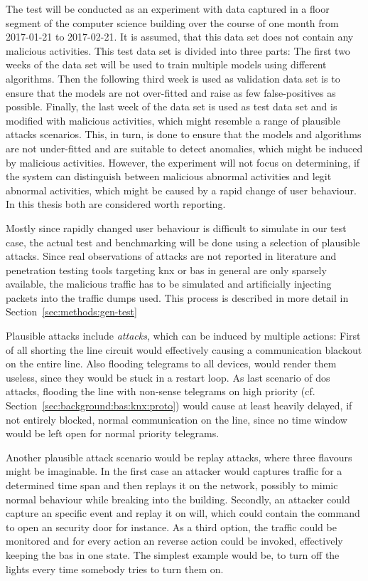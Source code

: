 The test will be conducted as an experiment with data captured in a floor segment of the computer science building over the course of one month from 2017-01-21 to 2017-02-21. It is assumed, that this data set does not contain any malicious activities.
This test data set is divided into three parts:
The first two weeks of the data set will be used to train multiple models using different algorithms.
Then the following third week is used as validation data set is to ensure that the models are not over-fitted and raise as few false-positives as possible.
Finally, the last week of the data set is used as test data set and is modified with malicious activities, which might resemble a range of plausible attacks scenarios.
This, in turn, is done to ensure that the models and algorithms are not under-fitted and are suitable to detect anomalies, which might be induced by malicious activities.
However, the experiment will not focus on determining, if the system can distinguish between malicious abnormal activities and legit abnormal activities, which might be caused by a rapid change of user behaviour. In this thesis both are considered worth reporting.

Mostly since rapidly changed user behaviour is difficult to simulate in our test case, the actual test and benchmarking will be done using a selection of plausible attacks.
Since real observations of attacks are not reported in literature and penetration testing tools targeting \gls{knx} or \gls{bas} in general are only sparsely available, the malicious traffic has to be simulated and artificially injecting packets into the traffic dumps used. This process is described in more detail in Section~\ref{sec:methods:gen-test}

Plausible attacks include \emph{ attacks}, which can be induced by multiple actions: First of all shorting the line circuit would effectively causing a communication blackout on the entire line. Also flooding  telegrams to all devices, would render them useless, since they would be stuck in a restart loop. As last scenario of \gls{dos} attacks, flooding the line with non-sense telegrams on high priority (cf. Section~\ref{sec:background:bas:knx:proto}) would cause at least heavily delayed, if not entirely blocked, normal communication on the line, since no time window would be left open for normal priority telegrams.

Another plausible attack scenario would be replay attacks, where three flavours might be imaginable.
In the first case an attacker would captures traffic for a determined time span and then replays it on the network, possibly to mimic normal behaviour while breaking into the building.
Secondly, an attacker could capture an specific event and replay it on will, which could contain the command to open an security door for instance.
As a third option, the traffic could be monitored and for every action an reverse action could be invoked, effectively keeping the \gls{bas} in one state. The simplest example would be, to turn off the lights every time somebody tries to turn them on.


